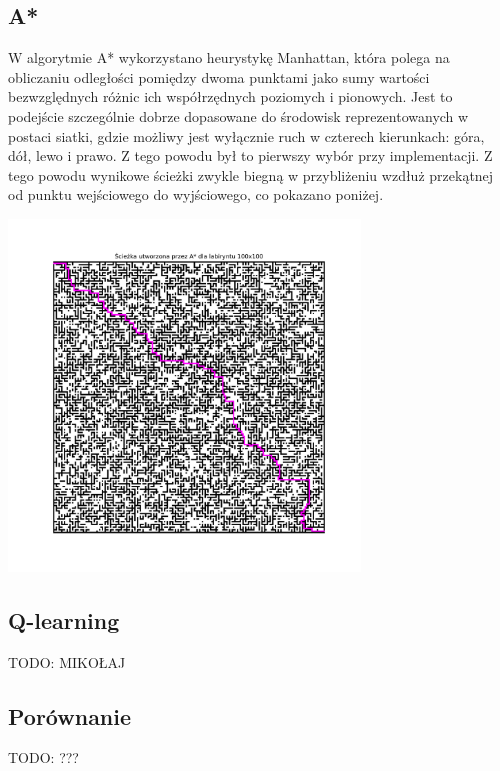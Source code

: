 \documentclass[a4paper,12pt]{article}
\begin{document}
\subsection{A*}
	W algorytmie A* wykorzystano heurystykę Manhattan, która polega na obliczaniu odległości pomiędzy dwoma punktami jako sumy wartości bezwzględnych różnic ich współrzędnych poziomych i pionowych. Jest to podejście szczególnie dobrze dopasowane do środowisk reprezentowanych w postaci siatki, gdzie możliwy jest wyłącznie ruch w czterech kierunkach: góra, dół, lewo i prawo. Z tego powodu był to pierwszy wybór przy implementacji. Z tego powodu wynikowe ścieżki zwykle biegną w przybliżeniu wzdłuż przekątnej od punktu wejściowego do wyjściowego, co pokazano poniżej.
\begin{center}
    \includegraphics[width=0.7\textwidth]{../images/A*_path.png}
\end{center}

\subsection{Q-learning}
	TODO: MIKOŁAJ %
	
\subsection{Porównanie}
	TODO: ??? %


\end{document}
